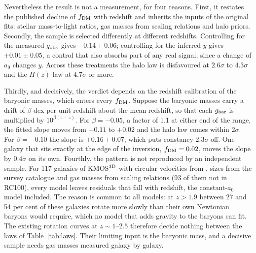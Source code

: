 \documentclass[fleqn,usenatbib]{mnras}
\begin{document}
Nevertheless the result is not a measurement, for four reasons. First, it restates the published decline of $f_{\rm DM}$ with redshift and inherits the inputs of the original fits: stellar mass-to-light ratios, gas masses from scaling relations and halo priors. Secondly, the sample is selected differently at different redshifts. Controlling for the measured $g_{\rm obs}$ gives $-0.14\pm0.06$; controlling for the inferred $y$ gives $+0.01\pm0.05$, a control that also absorbs part of any real signal, since a change of $a_0$ changes $y$. Across these treatments the halo law is disfavoured at $2.6\sigma$ to $4.3\sigma$ and the $H(z)$ law at $4.7\sigma$ or more.

Thirdly, and decisively, the verdict depends on the redshift calibration of the baryonic masses, which enters every $f_{\rm DM}$. Suppose the baryonic masses carry a drift of $\beta$ dex per unit redshift about the mean redshift, so that each $g_{\rm bar}$ is multiplied by $10^{\beta(z-\bar z)}$. For $\beta=-0.05$, a factor of 1.1 at either end of the range, the fitted slope moves from $-0.11$ to $+0.02$ and the halo law comes within $2\sigma$. For $\beta=-0.10$ the slope is $+0.16\pm0.07$, which puts constancy $2.3\sigma$ off. One galaxy that sits exactly at the edge of the inversion, $f_{\rm DM}=0.02$, moves the slope by $0.4\sigma$ on its own. Fourthly, the pattern is not reproduced by an independent sample. For 117 galaxies of KMOS$^{\rm 3D}$ with circular velocities from \citet{Ubler2017}, sizes from the survey catalogue \citep{Wisnioski2019} and gas masses from scaling relations (93 of them not in RC100), every model leaves residuals that fall with redshift, the constant-$a_0$ model included. The reason is common to all models: at $z>1.9$ between 27 and 54 per cent of these galaxies rotate more slowly than their own Newtonian baryons would require, which no model that adds gravity to the baryons can fit. The existing rotation curves at $z\sim1$--$2.5$ therefore decide nothing between the laws of Table~\ref{tab:laws}. Their limiting input is the baryonic mass, and a decisive sample needs gas masses measured galaxy by galaxy.
\end{document}
